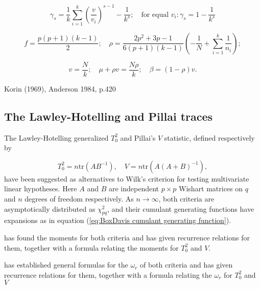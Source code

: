 \begin{equation}
	\gamma_s = \frac{1}{k} \sum_{i=1}^{k} \left( \frac{v}{v_i} \right)^{s-1}-\frac{1}{k^s}; \quad \text{for equal } v_i: \gamma_s = 1-\frac{1}{k^s}
\end{equation}


\begin{equation}
	f=\frac{p(p+1)(k-1)}{2} ; \quad \rho=\frac{2p^2+3p-1}{6(p+1)(k-1)} \left(-\frac{1}{N}  +\sum_{i=1}^k \frac{1}{n_i}  \right);
\end{equation}

\begin{equation}
	v=\frac{N}{k}; \quad \mu+\rho v=\frac{N\rho}{k}; \quad  \beta=(1-\rho)v.
\end{equation}

Korin (1969), Anderson 1984, p.420






\subsection{The Lawley-Hotelling and Pillai traces}
\label{BoxDavis:The Lawley-Hotelling and Pillai traces}

The Lawley-Hotelling generalized $T_0^2$ and Pillai's $V$ statistic, defined respectively by

\begin{equation}
	T_0^2 = n \text{tr} (AB^{-1}), \quad V = n \text{tr} (A(A+B)^{-1}),
\end{equation}
have been suggested as alternatives to Wilk's criterion for testing multivariate linear hypotheses. Here $A$ and $B$ are independent $p \times p$ Wishart matrices on $q$ and $n$ degrees of freedom respectively. As $n \rightarrow \infty$, both criteria are asymptotically distributed as $\chi^2_{pq}$, and their cumulant generating functions have expansions as in equation (\ref{eq:BoxDavis cumulant generating function}).

\cite{Davis_1968} has found the moments for both criteria and has given recurrence relations for them, together with a formula relating the moments for $T_0^2$ and  $V$.

\cite{Davis_1970b} has established general formulas for the $\omega_r$ of both criteria and has given recurrence relations for them, together with a formula relating the $\omega_r$ for $T_0^2$ and  $V$



